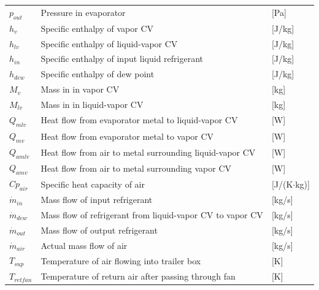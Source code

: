 \begin{center}
	\begin{tabular}{l p{10cm} l}
		$ p_{out} $      & Pressure in evaporator                                                   & [\si{Pa}] \\
		$h_{v} $         & Specific enthalpy of vapor CV                                            & [\si{J}/\si{kg}]                  \\
		$h_{lv} $        & Specific enthalpy of liquid-vapor CV                                     & [\si{J}/\si{kg}]                  \\
		$h_{in} $        & Specific enthalpy of input liquid refrigerant                            & [\si{J}/\si{kg}]                  \\
		$h_{dew}$        & Specific enthalpy of dew point                                           & [\si{J}/\si{kg}]                  \\
		$M_{v}$          & Mass in	in vapor CV                                                      & [\si{kg}]                  \\
		$M_{lv}$         & Mass in	in liquid-vapor CV                                               & [\si{kg}]                  \\
		$Q_{mlv}$        & Heat flow from evaporator metal to liquid-vapor CV                       & [\si{W}]                          \\
		$Q_{mv}$         & Heat flow from evaporator metal to vapor CV                              & [\si{W}]                          \\
		$Q_{amlv}$       & Heat flow from air to metal surrounding liquid-vapor CV                  & [\si{W}]                          \\
		$Q_{amv}$        & Heat flow from air to metal surrounding vapor CV                         & [\si{W}]                          \\
		$Cp_{air}$       & Specific heat capacity of air                                            & [\si{J}/(\si{K}$ \cdot $\si{kg})] \\
		$\dot{m}_{in} $  & Mass flow of input refrigerant                                           & [\si{kg}/\si{s}]                  \\
		$\dot{m}_{dew} $ & Mass flow of refrigerant from liquid-vapor CV to vapor CV                & [\si{kg}/\si{s}]                  \\
		$\dot{m}_{out} $ & Mass flow of output refrigerant                                          & [\si{kg}/\si{s}]                  \\
		$\dot{m}_{air}$  & Actual mass flow of air                                                  & [\si{kg}/\si{s}]                  \\
		$T_{sup} $       & Temperature of air flowing into trailer box                              & [\si{K}]                          \\
		$T_{retfan}$     & Temperature of return air after passing through fan                      & [\si{K}]
	\end{tabular}
\end{center}

